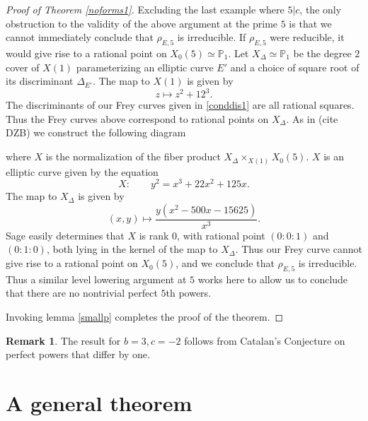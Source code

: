 \documentclass[12pt]{amsart}
\theoremstyle{definition}
\newtheorem{rem}[thm]{Remark}
\def\P{{{\mathbb P}}}
\begin{document}
\begin{proof}[Proof of Theorem \ref{noforms1}]
Excluding the last example where $5|c$, the only obstruction to the validity of the above argument at the prime $5$ is that we cannot immediately conclude that $\rho_{E,5}$ is irreducible.  If $\rho_{E,5}$ were reducible, it would give rise to a rational point on $X_0(5) \simeq \P_1$.  Let $X_{\Delta} \simeq \P_1$ be the degree $2$ cover of $X(1)$ parameterizing an elliptic curve $E'$ and a choice of square root of its discriminant $\Delta_{E'}$.  The map to $X(1)$ is given by
\[z \mapsto z^2 + 12^3. \]
The discriminants of our Frey curves given in \eqref{conddis1} are all rational squares.  Thus the Frey curves above correspond to rational points on $X_{\Delta}$.
As in (cite DZB) we construct the following diagram
\begin{center}
\end{center}
where $X$ is the normalization of the fiber product $X_{\Delta} \times_{X(1)} X_0(5)$.  $X$ is an elliptic curve given by the equation
\[X: \qquad  y^2 = x^3 + 22x^2 +125x .\]
The map to $X_{\Delta}$ is given by
\[ (x,y) \mapsto \frac{y(x^2-500x -15625)}{x^3}. \]
Sage easily determines that $X$ is rank $0$, with rational point $(0:0:1)$ and $(0:1:0)$, both lying in the kernel of the map to $X_{\Delta}$.  Thus our Frey curve cannot give rise to a rational point on $X_0(5)$, and we conclude that $\rho_{E,5}$ is irreducible.  Thus a similar level lowering argument at $5$ works here to allow us to conclude that there are no nontrivial perfect $5$th powers.

Invoking lemma \ref{smallp} completes the proof of the theorem.
\end{proof}

\begin{rem}
The result for $b = 3, c = -2$ follows from Catalan's Conjecture on perfect powers that differ by one.
\end{rem}


\section{A general theorem}
\end{document}
